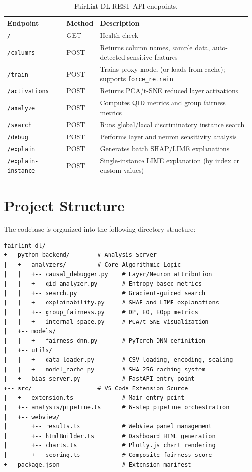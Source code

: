 \begin{table}[H]
\centering
\caption{FairLint-DL REST API endpoints.}
\label{tab:api}
\begin{tabular}{@{}llp{7cm}@{}}
\toprule
\textbf{Endpoint} & \textbf{Method} & \textbf{Description} \\
\midrule
\texttt{/} & GET & Health check \\
\texttt{/columns} & POST & Returns column names, sample data, auto-detected sensitive features \\
\texttt{/train} & POST & Trains proxy model (or loads from cache); supports \texttt{force\_retrain} \\
\texttt{/activations} & POST & Returns PCA/t-SNE reduced layer activations \\
\texttt{/analyze} & POST & Computes QID metrics and group fairness metrics \\
\texttt{/search} & POST & Runs global/local discriminatory instance search \\
\texttt{/debug} & POST & Performs layer and neuron sensitivity analysis \\
\texttt{/explain} & POST & Generates batch SHAP/LIME explanations \\
\texttt{/explain-instance} & POST & Single-instance LIME explanation (by index or custom values) \\
\bottomrule
\end{tabular}
\end{table}

\section{Project Structure}

The codebase is organized into the following directory structure:

\begin{lstlisting}[language={}, caption={FairLint-DL project structure.}]
fairlint-dl/
+-- python_backend/        # Analysis Server
|   +-- analyzers/         # Core Algorithmic Logic
|   |   +-- causal_debugger.py    # Layer/Neuron attribution
|   |   +-- qid_analyzer.py       # Entropy-based metrics
|   |   +-- search.py             # Gradient-guided search
|   |   +-- explainability.py     # SHAP and LIME explanations
|   |   +-- group_fairness.py     # DP, EO, EOpp metrics
|   |   +-- internal_space.py     # PCA/t-SNE visualization
|   +-- models/
|   |   +-- fairness_dnn.py       # PyTorch DNN definition
|   +-- utils/
|   |   +-- data_loader.py        # CSV loading, encoding, scaling
|   |   +-- model_cache.py        # SHA-256 caching system
|   +-- bias_server.py            # FastAPI entry point
+-- src/                   # VS Code Extension Source
|   +-- extension.ts              # Main entry point
|   +-- analysis/pipeline.ts      # 6-step pipeline orchestration
|   +-- webview/
|       +-- results.ts            # WebView panel management
|       +-- htmlBuilder.ts        # Dashboard HTML generation
|       +-- charts.ts             # Plotly.js chart rendering
|       +-- scoring.ts            # Composite fairness score
+-- package.json                  # Extension manifest
\end{lstlisting}

